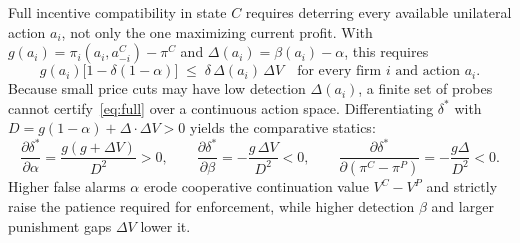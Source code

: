 Full incentive compatibility in state $C$ requires deterring every available unilateral action $a_i$, not only the one maximizing current profit. With $g(a_i)=\pi_i(a_i,a_{-i}^C)-\pi^C$ and $\Delta(a_i)=\beta(a_i)-\alpha$, this requires
\begin{equation}\label{eq:full}
g(a_i)\bigl[1-\delta(1-\alpha)\bigr] \;\leq\;
\delta\,\Delta(a_i)\,\Delta V
\quad\text{for every firm } i \text{ and action } a_i.
\end{equation}
Because small price cuts may have low detection $\Delta(a_i)$, a finite set of probes cannot certify~\eqref{eq:full} over a continuous action space. Differentiating $\delta^*$ with $D=g(1-\alpha)+\Delta\cdot\Delta V > 0$ yields the comparative statics:
\begin{equation}\label{eq:compstat}
\frac{\partial\delta^*}{\partial\alpha}=\frac{g(g+\Delta V)}{D^2}>0,\qquad
\frac{\partial\delta^*}{\partial\beta}=-\frac{g\,\Delta V}{D^2}<0,\qquad
\frac{\partial\delta^*}{\partial(\pi^C-\pi^P)}=-\frac{g\Delta}{D^2}<0.
\end{equation}
Higher false alarms $\alpha$ erode cooperative continuation value $V^C-V^P$ and strictly raise the patience required for enforcement, while higher detection $\beta$ and larger punishment gaps $\Delta V$ lower it.

